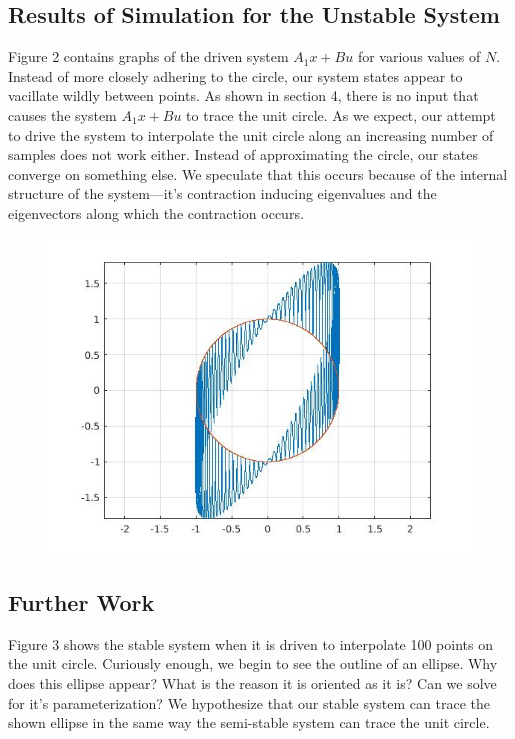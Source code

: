 \documentclass[12pt,letterpaper]{article}
\begin{document}
\subsection{Results of Simulation for the Unstable System}
Figure 2 contains graphs of the driven system $A_{1}x + Bu$ for various values of $N$. Instead of more closely adhering to the circle, our system states appear to vacillate wildly between points. As shown in section 4, there is no input that causes the system $A_{1}x + Bu$ to trace the unit circle. As we expect, our attempt to drive the system to interpolate the unit circle along an increasing number of samples does not work either. Instead of approximating the circle, our states converge on something else.  We speculate that this occurs because of the internal structure of the system---it's contraction inducing eigenvalues and the eigenvectors along which the contraction occurs.
\pagebreak

\begin{figure}
\includegraphics[width=5in]{./stab100.jpg}
\caption{}
\end{figure}
\subsection{Further Work}
Figure 3 shows the stable system when it is driven to interpolate 100 points on the unit circle. Curiously enough, we begin to see the outline of an ellipse. Why does this ellipse appear? What is the reason it is oriented as it is? Can we solve for it's parameterization? We hypothesize that our stable system can trace the shown ellipse in the same way the semi-stable system can trace the unit circle.\\
\end{document}
